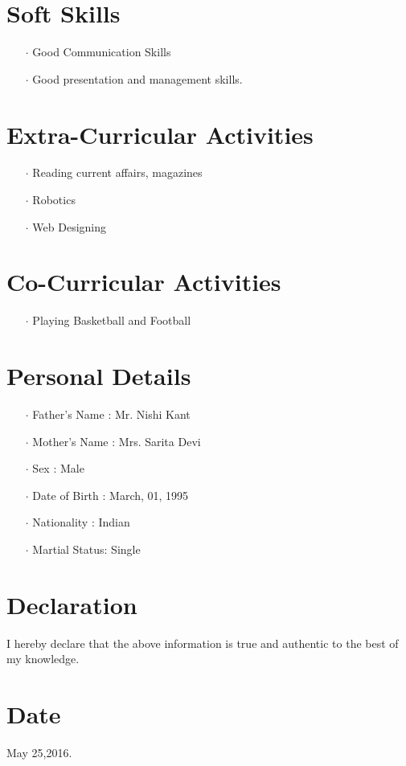 \documentclass[11pt]{article}
\begin{document}
	\section*{Soft Skills}
	\begin{itemize}
		\item[$\cdot$] Good Communication Skills		\item[$\cdot$]Good presentation and management skills.
	\end{itemize}
	\section*{Extra-Curricular Activities}
	\begin{itemize}
		\item[$\cdot$]Reading current affairs, magazines
		\item[$\cdot$]Robotics
		\item[$\cdot$]Web Designing
	\end{itemize}
	\section*{Co-Curricular Activities}
	\begin{itemize}
		\item[$\cdot$] Playing Basketball and Football
	\end{itemize}
	\section*{Personal Details}
	\begin{itemize}
		\item[$\cdot$]Father's Name : Mr. Nishi Kant
		\item[$\cdot$]Mother's Name : Mrs. Sarita Devi
		\item[$\cdot$]Sex           : Male
		\item[$\cdot$]Date of Birth : March, 01, 1995
		\item[$\cdot$]Nationality   : Indian
		\item[$\cdot$]Martial Status: Single
	\end{itemize}
	\section*{Declaration} I hereby declare that the above information is true and authentic to the best of my knowledge.
	\section*{Date} May 25,2016.
	
\end{document}
